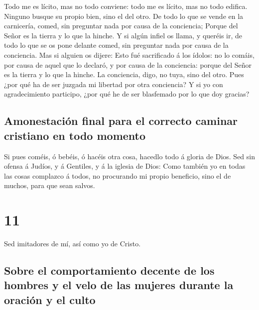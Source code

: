  Todo me es lícito, mas no todo conviene: todo me es
lícito, mas no todo edifica.  Ninguno busque su propio
bien, sino el del otro.  De todo lo que se vende en la
carnicería, comed, sin preguntar nada por causa de la conciencia;
 Porque del Señor es la tierra y lo que la hinche.
 Y si algún infiel os llama, y queréis ir, de todo lo que
se os pone delante comed, sin preguntar nada por causa de la conciencia.
 Mas si alguien os dijere: Esto fué sacrificado á los
ídolos: no lo comáis, por causa de aquel que lo declaró, y por causa de
la conciencia: porque del Señor es la tierra y lo que la hinche.
 La conciencia, digo, no tuya, sino del otro. Pues ¿por
qué ha de ser juzgada mi libertad por otra conciencia?  Y
si yo con agradecimiento participo, ¿por qué he de ser blasfemado por lo
que doy gracias?

\hypertarget{amonestaciuxf3n-final-para-el-correcto-caminar-cristiano-en-todo-momento}{%
\subsection{Amonestación final para el correcto caminar cristiano en
todo
momento}\label{amonestaciuxf3n-final-para-el-correcto-caminar-cristiano-en-todo-momento}}

 Si pues coméis, ó bebéis, ó hacéis otra cosa, hacedlo
todo á gloria de Dios.  Sed sin ofensa á Judíos, y á
Gentiles, y á la iglesia de Dios:  Como también yo en
todas las cosas complazco á todos, no procurando mi propio beneficio,
sino el de muchos, para que sean salvos.

\hypertarget{section-10}{%
\section{11}\label{section-10}}

 Sed imitadores de mí, así como yo de Cristo.

\hypertarget{sobre-el-comportamiento-decente-de-los-hombres-y-el-velo-de-las-mujeres-durante-la-oraciuxf3n-y-el-culto}{%
\subsection{Sobre el comportamiento decente de los hombres y el velo de
las mujeres durante la oración y el
culto}\label{sobre-el-comportamiento-decente-de-los-hombres-y-el-velo-de-las-mujeres-durante-la-oraciuxf3n-y-el-culto}}

